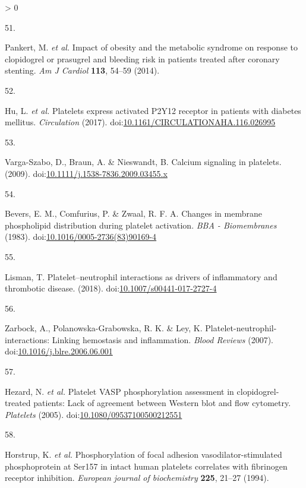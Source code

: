 \documentclass[11pt,twoside]{bristolthesis}
\newlength{\cslhangindent}
\newlength{\csllabelwidth}
\newenvironment{CSLReferences}[2] %
 {%
  \setlength{\parindent}{0pt}
  \ifodd #1 \everypar{\setlength{\hangindent}{\cslhangindent}}\ignorespaces\fi
  \ifnum #2 > 0
  \setlength{\parskip}{#2\baselineskip}
  \fi
 }%
 {}
\newcommand{\CSLLeftMargin}[1]{\parbox[t]{\csllabelwidth}{#1}}
\newcommand{\CSLRightInline}[1]{\parbox[t]{\linewidth - \csllabelwidth}{#1}\break}
\begin{document}
\begin{CSLReferences}{0}{0}
\leavevmode\hypertarget{ref-Pankert2014}{}%
\CSLLeftMargin{51. }
\CSLRightInline{Pankert, M. \emph{et al.} {Impact of obesity and the metabolic syndrome on response to clopidogrel or prasugrel and bleeding risk in patients treated after coronary stenting}. \emph{Am J Cardiol} \textbf{113}, 54--59 (2014).}

\leavevmode\hypertarget{ref-Hu2017}{}%
\CSLLeftMargin{52. }
\CSLRightInline{Hu, L. \emph{et al.} {Platelets express activated P2Y12 receptor in patients with diabetes mellitus}. \emph{Circulation} (2017). doi:\href{https://doi.org/10.1161/CIRCULATIONAHA.116.026995}{10.1161/CIRCULATIONAHA.116.026995}}

\leavevmode\hypertarget{ref-Varga-Szabo2009}{}%
\CSLLeftMargin{53. }
\CSLRightInline{Varga-Szabo, D., Braun, A. \& Nieswandt, B. {Calcium signaling in platelets}. (2009). doi:\href{https://doi.org/10.1111/j.1538-7836.2009.03455.x}{10.1111/j.1538-7836.2009.03455.x}}

\leavevmode\hypertarget{ref-Bevers1983}{}%
\CSLLeftMargin{54. }
\CSLRightInline{Bevers, E. M., Comfurius, P. \& Zwaal, R. F. A. {Changes in membrane phospholipid distribution during platelet activation}. \emph{BBA - Biomembranes} (1983). doi:\href{https://doi.org/10.1016/0005-2736(83)90169-4}{10.1016/0005-2736(83)90169-4}}

\leavevmode\hypertarget{ref-Lisman2018}{}%
\CSLLeftMargin{55. }
\CSLRightInline{Lisman, T. {Platelet--neutrophil interactions as drivers of inflammatory and thrombotic disease}. (2018). doi:\href{https://doi.org/10.1007/s00441-017-2727-4}{10.1007/s00441-017-2727-4}}

\leavevmode\hypertarget{ref-Zarbock2007}{}%
\CSLLeftMargin{56. }
\CSLRightInline{Zarbock, A., Polanowska-Grabowska, R. K. \& Ley, K. {Platelet-neutrophil-interactions: Linking hemostasis and inflammation}. \emph{Blood Reviews} (2007). doi:\href{https://doi.org/10.1016/j.blre.2006.06.001}{10.1016/j.blre.2006.06.001}}

\leavevmode\hypertarget{ref-Hezard2005}{}%
\CSLLeftMargin{57. }
\CSLRightInline{Hezard, N. \emph{et al.} {Platelet VASP phosphorylation assessment in clopidogrel-treated patients: Lack of agreement between Western blot and flow cytometry}. \emph{Platelets} (2005). doi:\href{https://doi.org/10.1080/09537100500212551}{10.1080/09537100500212551}}

\leavevmode\hypertarget{ref-Horstrup1994}{}%
\CSLLeftMargin{58. }
\CSLRightInline{Horstrup, K. \emph{et al.} {Phosphorylation of focal adhesion vasodilator-stimulated phosphoprotein at Ser157 in intact human platelets correlates with fibrinogen receptor inhibition.} \emph{European journal of biochemistry} \textbf{225}, 21--27 (1994).}


\end{CSLReferences}
\end{document}
